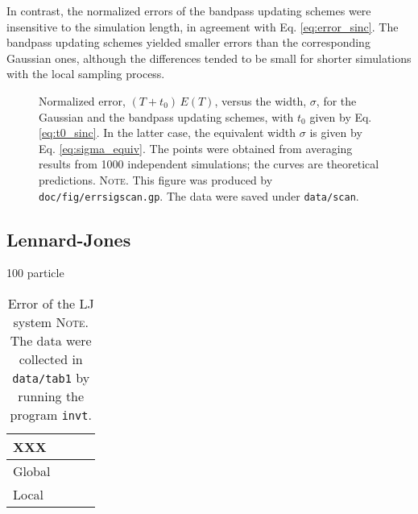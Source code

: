 \documentclass[reprint, superscriptaddress, floatfix]{revtex4-1}
\newcommand{\note}[1]{{\color{DarkGreen}\footnotesize \textsc{Note.} #1}}
\newcommand{\Err}{E}
\begin{document}
In contrast,
the normalized errors of the bandpass updating schemes
were insensitive to the simulation length,
in agreement with Eq. \eqref{eq:error_sinc}.
%
The bandpass updating schemes
yielded smaller errors than
the corresponding Gaussian ones,
although the differences tended to
be small for shorter simulations
with the local sampling process.



\begin{figure}[h]
\begin{center}
  \caption{
    \label{fig:errsigscan}
    Normalized error, $(T + t_0) \, \Err(T)$,
    versus the width, $\sigma$,
    for the Gaussian
    and the bandpass updating schemes,
    with $t_0$ given by Eq. \eqref{eq:t0_sinc}.
    In the latter case,
    the equivalent width
    $\sigma$ is given by Eq. \eqref{eq:sigma_equiv}.
    The points were obtained from averaging results
    from 1000 independent simulations;
    the curves are theoretical predictions.
    \note{This figure was produced by
      \texttt{doc/fig/errsigscan.gp}.
      The data were saved under
      \texttt{data/scan}.
    }%
  }
\end{center}
\end{figure}


\subsection{\label{sec:lj}Lennard-Jones}


100 particle
\begin{table}[h]\footnotesize
  \caption{\label{tab:error_LJ}
    Error of the LJ system
    \note{\newline
      The data were collected in
      \texttt{data/tab1} by running
      the program \texttt{invt}.
    }%
  }
  \setlength{\tabcolsep}{2pt}
  \renewcommand\arraystretch{1.2}
  \begin{tabular} { l | p{2.2cm} p{2.4cm} p{2.0cm} }
    \hline
      XXX
    &
    &
    &
    \\
    \hline
    Global
    &
    &
    &
    \\
    \hline
    Local
    &
    &
    &
    \\
    \hline
  \end{tabular}
\end{table}
\end{document}

